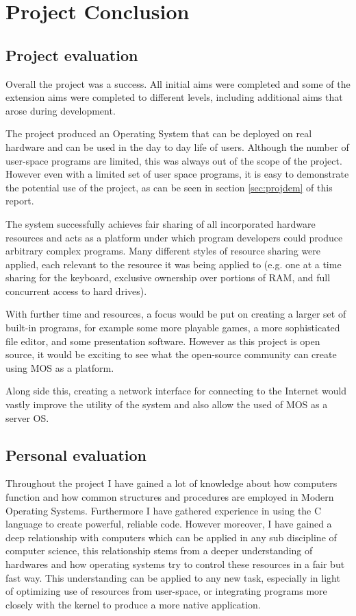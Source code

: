\documentclass[a4paper]{report}
\begin{document}
\chapter{Project Conclusion}

\section{Project evaluation}

Overall the project was a success. All initial aims were completed and some of the extension aims were completed to different levels, including additional aims that arose during development.

The project produced an Operating System that can be deployed on real hardware and can be used in the day to day life of users. Although the number of user-space programs are limited, this was always out of the scope of the project. However even with a limited set of user space programs, it is easy to demonstrate the potential use of the project, as can be seen in section \ref{sec:projdem} of this report.

The system successfully achieves fair sharing of all incorporated hardware resources and acts as a platform under which program developers could produce arbitrary complex programs. Many different styles of resource sharing were applied, each relevant to the resource it was being applied to (e.g. one at a time sharing for the keyboard, exclusive ownership over portions of RAM, and full concurrent access to hard drives).

With further time and resources, a focus would be put on creating a larger set of built-in programs, for example some more playable games, a more sophisticated file editor, and some presentation software. However as this project is open source, it would be exciting to see what the open-source community can create using MOS as a platform.

Along side this, creating a network interface for connecting to the Internet would vastly improve the utility of the system and also allow the used of MOS as a server OS.


\section{Personal evaluation}

Throughout the project I have gained a lot of knowledge about how computers function and how common structures and procedures are employed in Modern Operating Systems. Furthermore I have gathered experience in using the C language to create powerful, reliable code. However moreover, I have gained a deep relationship with computers which can be applied in any sub discipline of computer science, this relationship stems from a deeper understanding of hardwares and how operating systems try to control these resources in a fair but fast way. This understanding can be applied to any new task, especially in light of optimizing use of resources from user-space, or integrating programs more closely with the kernel to produce a more native application.
\end{document}
